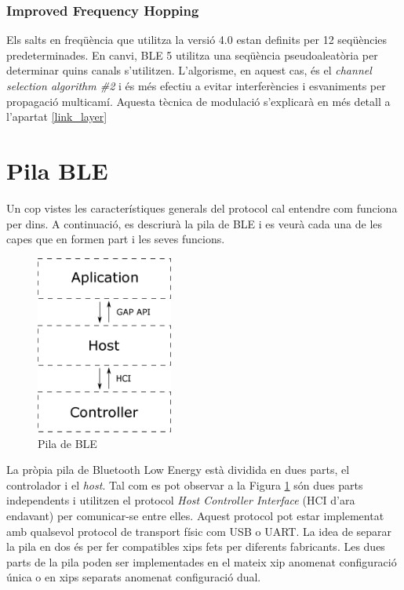\subsubsection{Improved Frequency Hopping}
Els salts en freqüència que utilitza la versió 4.0 estan definits per 12 seqüències predeterminades.
En canvi, BLE 5 utilitza una seqüència pseudoaleatòria per determinar quins canals s'utilitzen.
L'algorisme, en aquest cas, és el \textit{channel selection algorithm \#2} i és més efectiu a evitar interferències i esvaniments per propagació multicamí.
Aquesta tècnica de modulació s'explicarà en més detall a l'apartat \ref{link_layer}

\section{Pila BLE}
Un cop vistes les característiques generals del protocol cal entendre com funciona per dins.
A continuació, es descriurà la pila de BLE i es veurà cada una de les capes que en formen part i les seves funcions.

\begin{figure}[h!]
	\begin{center}
		\includegraphics[width=0.4\textwidth]{./diagrames/BLE_Stack_Simplified}
		\caption{Pila de BLE}
		\label{ble_stack}
	\end{center}
\end{figure}

La pròpia pila de Bluetooth Low Energy està dividida en dues parts, el controlador i el \textit{host}.
Tal com es pot observar a la Figura \ref{ble_stack} són dues parts independents i utilitzen el protocol \textit{Host Controller Interface} (HCI d'ara endavant) per comunicar-se entre elles.
Aquest protocol pot estar implementat amb qualsevol protocol de transport físic com USB o UART.
La idea de separar la pila en dos és per fer compatibles xips fets per diferents fabricants.
Les dues parts de la pila poden ser implementades en el mateix xip anomenat configuració única o en xips separats anomenat configuració dual.


